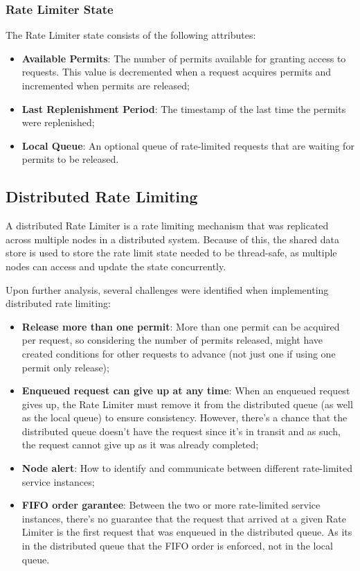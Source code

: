 \subsubsection{Rate Limiter State}\label{subsubsec:rate-limiter-state}

The Rate Limiter state consists of the following attributes:

\begin{itemize}
    \item \textbf{Available Permits}: The number of permits available for granting access to requests.
    This value is decremented when a request acquires permits and incremented when permits are released;
    \item \textbf{Last Replenishment Period}: The timestamp of the last time the permits were replenished;
    \item \textbf{Local Queue}: An optional queue of rate-limited requests that are waiting for permits to be released.
\end{itemize}

\subsection{Distributed Rate Limiting}\label{subsec:rate-limiter-distributed}

A distributed Rate Limiter is a rate limiting mechanism
that was replicated across multiple nodes in a distributed system.
Because of this, the shared data store is used to store the rate limit state needed to be thread-safe, as multiple nodes can access and update the state concurrently.

Upon further analysis, several challenges were identified when implementing distributed rate limiting:

\begin{itemize}
    \item \textbf{Release more than one permit}: More than one permit can be acquired per request, so considering the number of permits released, might have created conditions for other requests to advance (not just one if using one permit only release);
    \item \textbf{Enqueued request can give up at any time}: When an enqueued request gives up, the Rate Limiter must remove it from the distributed queue (as well as the local queue) to ensure consistency.
    However, there's a chance that the distributed queue doesn't have the request since it's in transit and as such,
    the request cannot give up as it was already completed;
    \item \textbf{Node alert}:
    How to identify and communicate between different rate-limited service instances;
    \item \textbf{FIFO order garantee}: Between the two or more rate-limited service instances, there's no guarantee that the request that arrived at a given Rate Limiter is the first request that was enqueued in the distributed queue. As its in the distributed queue that the FIFO order is enforced, not in the local queue.
\end{itemize}

